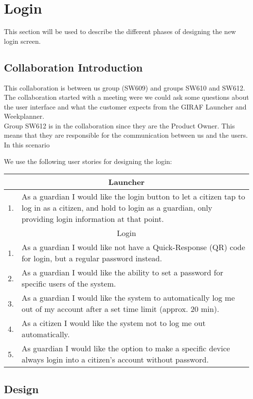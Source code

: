 \section{Login}\label{sec:LoginColab}
This section will be used to describe the different phases of designing the new
login screen.

\subsection{Collaboration Introduction}
This collaboration is between us group (SW609) and groups SW610 and SW612. The
collaboration started with a meeting were we could ask some questions about the
user interface and what the customer expects from the GIRAF Launcher and
Weekplanner. \\
Group SW612 is in the collaboration since they are the Product Owner. This means
that they are responsible for the communication between us and the users. In
this scenario 

We use the following user stories for designing the login:
\begin{table}[H]
\begin{tabular}{|c|p{12.5cm}|}
\hline 
\multicolumn{2}{|c|}{Launcher}\\
\hline
1. & As a guardian I would like the login button to let a citizen tap to log in
as a citizen, and hold to login as a guardian, only providing login information
at that point. \\ \hline
\multicolumn{2}{|c|}{Login}\\ \hline
1. & As a guardian I would like not have a Quick-Response (QR) code for login,
but a regular password instead.\\ \hline
2. & As a guardian I would like the ability to set a password for specific users
of the system.\\ \hline
3. & As a guardian I would like the system to automatically log me out of my
account after a set time limit (approx. 20 min).\\ \hline
4. & As a citizen I would like the system not to log me out automatically.\\ \hline
5. & As guardian I would like the option to make a specific device always login
into a citizen's account without password.\\ \hline
\end{tabular}
\end{table}

\subsection{Design}


